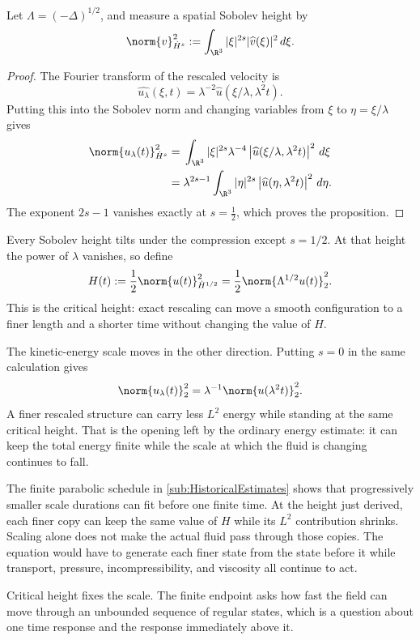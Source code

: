 Let \(\Lambda=(-\Delta)^{1/2}\), and measure a spatial Sobolev height by
\[
  \norm{v}_{\dot H^s}^2
  :=
  \int_{\R^3}
  |\xi|^{2s}|\widehat v(\xi)|^2
  \,d\xi.
\]
\begin{proof}
The Fourier transform of the rescaled velocity is
\[
  \widehat{u_\lambda}(\xi,t)
  =
  \lambda^{-2}
  \widehat u(\xi/\lambda,\lambda^2t).
\]
Putting this into the Sobolev norm and changing variables from \(\xi\) to \(\eta=\xi/\lambda\) gives
\begin{align*}
  \norm{u_\lambda(t)}_{\dot H^s}^2
  &={}
  \int_{\R^3}
  |\xi|^{2s}\lambda^{-4}
  \left|\widehat u(\xi/\lambda,\lambda^2t)\right|^2
  \,d\xi
  \\
  &={}
  \lambda^{2s-1}
  \int_{\R^3}
  |\eta|^{2s}
  \left|\widehat u(\eta,\lambda^2t)\right|^2
  \,d\eta.
\end{align*}
The exponent \(2s-1\) vanishes exactly at \(s=\tfrac12\), which proves the proposition.
\end{proof}
Every Sobolev height tilts under the compression except \(s=1/2\).
At that height the power of \(\lambda\) vanishes, so define
\[
  H(t)
  :=
  \frac12\norm{u(t)}_{\dot H^{1/2}}^2
  =
  \frac12\norm{\Lambda^{1/2}u(t)}_2^2.
\]
This is the critical height: exact rescaling can move a smooth configuration to a finer length and a shorter time without changing the value of \(H\).

The kinetic-energy scale moves in the other direction.
Putting \(s=0\) in the same calculation gives
\[
  \norm{u_\lambda(t)}_2^2
  =
  \lambda^{-1}
  \norm{u(\lambda^2t)}_2^2.
\]
A finer rescaled structure can carry less \(L^2\) energy while standing at the same critical height.
That is the opening left by the ordinary energy estimate: it can keep the total energy finite while the scale at which the fluid is changing continues to fall.

The finite parabolic schedule in \cref{sub:HistoricalEstimates} shows that progressively smaller scale durations can fit before one finite time.
At the height just derived, each finer copy can keep the same value of \(H\) while its \(L^2\) contribution shrinks.
Scaling alone does not make the actual fluid pass through those copies.
The equation would have to generate each finer state from the state before it while transport, pressure, incompressibility, and viscosity all continue to act.

Critical height fixes the scale.
The finite endpoint asks how fast the field can move through an unbounded sequence of regular states, which is a question about one time response and the response immediately above it.
